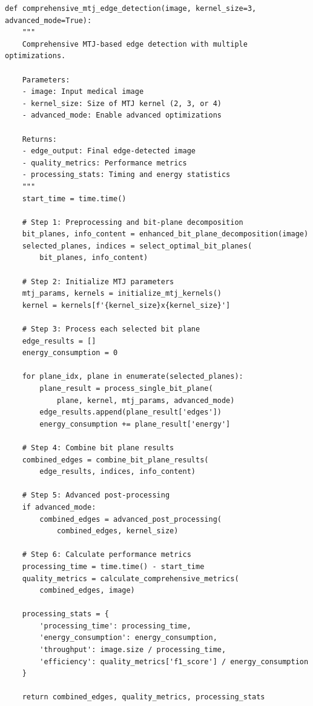 \documentclass[conference]{IEEEtran}
\begin{document}
\begin{lstlisting}[caption={Complete MTJ edge detection pipeline implementation}]
def comprehensive_mtj_edge_detection(image, kernel_size=3, advanced_mode=True):
    """
    Comprehensive MTJ-based edge detection with multiple optimizations.
    
    Parameters:
    - image: Input medical image
    - kernel_size: Size of MTJ kernel (2, 3, or 4)
    - advanced_mode: Enable advanced optimizations
    
    Returns:
    - edge_output: Final edge-detected image
    - quality_metrics: Performance metrics
    - processing_stats: Timing and energy statistics
    """
    start_time = time.time()
    
    # Step 1: Preprocessing and bit-plane decomposition
    bit_planes, info_content = enhanced_bit_plane_decomposition(image)
    selected_planes, indices = select_optimal_bit_planes(
        bit_planes, info_content)
    
    # Step 2: Initialize MTJ parameters
    mtj_params, kernels = initialize_mtj_kernels()
    kernel = kernels[f'{kernel_size}x{kernel_size}']
    
    # Step 3: Process each selected bit plane
    edge_results = []
    energy_consumption = 0
    
    for plane_idx, plane in enumerate(selected_planes):
        plane_result = process_single_bit_plane(
            plane, kernel, mtj_params, advanced_mode)
        edge_results.append(plane_result['edges'])
        energy_consumption += plane_result['energy']
    
    # Step 4: Combine bit plane results
    combined_edges = combine_bit_plane_results(
        edge_results, indices, info_content)
    
    # Step 5: Advanced post-processing
    if advanced_mode:
        combined_edges = advanced_post_processing(
            combined_edges, kernel_size)
    
    # Step 6: Calculate performance metrics
    processing_time = time.time() - start_time
    quality_metrics = calculate_comprehensive_metrics(
        combined_edges, image)
    
    processing_stats = {
        'processing_time': processing_time,
        'energy_consumption': energy_consumption,
        'throughput': image.size / processing_time,
        'efficiency': quality_metrics['f1_score'] / energy_consumption
    }
    
    return combined_edges, quality_metrics, processing_stats


\end{lstlisting}
\end{document}
